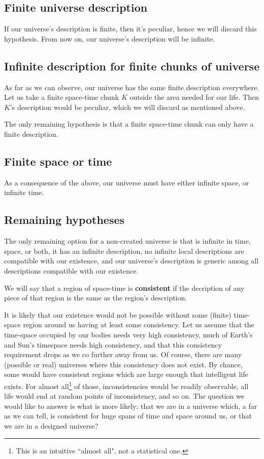 \documentclass[a4paper
,draft
]{article}
\newcommand{\definitie}[1]{\textbf{#1}}
\newcommand{\ghilimele}[1]{``#1"}
\begin{document}
\subsection{Finite universe description}

If our universe's description is finite, then it's peculiar, hence we will
discard this hypothesis. From now on, our universe's description will be
infinite.

\subsection{Infinite description for finite chunks of universe}

As far as we can observe, our universe has the same finite description
everywhere. Let us take a finite space-time chunk $K$ outside the area needed
for our life. Then $K$'s description would be peculiar, which we will discard
as mentioned above.

The only remaining hypothesis is that a finite space-time chunk can only have
a finite description.

\subsection{Finite space or time}

As a consequence of the above, our universe must have either infinite space,
or infinite time.

\subsection{Remaining hypotheses}

The only remaining option for a non-created universe is that is infinite in
time, space, or both, it has an infinite description, no infinite local
descriptions are compatible with our existence, and our universe's
description is generic among all descriptions compatible with our existence.

We will say that a region of space-time is \definitie{consistent} if the
decription of any piece of that region is the same as the region's description.

It is likely that our existence would not be possible without some (finite)
time-space region around us having at least some consistency. Let us assume
that the time-space occupied by our bodies needs very high consistency, much
of Earth's and Sun's timespace needs high consistency, and that this
consistency requirement drops as we co further away from us. Of course,
there are many (possible or real) universes where this consistency does
not exist. By chance, some would have consistent regions which are large
enough that intelligent life exists. For almost all\footnote{This is an
intuitive \ghilimele{almost all}, not a statistical one.} of those,
inconsistencies would be readily observable, all life would end at
random points of inconsistency, and so on. The question we would like to
answer is what is more likely: that we are in a universe which, a far as we can tell, is consistent for huge spans of time and space around us, or that we are in a designed universe?
\end{document}
